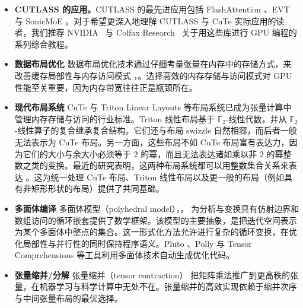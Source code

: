 \begin{itemize}
    \item {\bf CUTLASS 的应用。}CUTLASS 的最先进应用包括 FlashAttention \cite{dao2023flashattention2, shah2024flashattention3}、EVT \cite{chen2024evt} 与 SonicMoE \cite{sonic}。对于希望更深入地理解 CUTLASS 与 CuTe 实际应用的读者，我们推荐 NVIDIA~\cite{cecka2024cutlass, sun2025cutlass, thakkar2025cutlass} 与 Colfax Research~\cite{shah2024cutlass_streamk, shah2025cutlass_blackwell_tensor_memory, shah2025cutlass_blackwell_clusters, shah2025cutlass_blackwell_subbyte} 关于用这些库进行 GPU 编程的系列综合教程。
    \item {\bf 数据布局优化} 数据布局优化技术通过仔细考量张量在内存中的存储方式，来改善缓存局部性与内存访问模式 \cite{xu2023alt, bacon1994compiler, raman2007structure, ju1992reduction}，\cite{sharma2015data}。选择高效的内存存储与访问模式对 GPU 性能至关重要，因为内存带宽往往正是瓶颈所在。
    \item {\bf 现代布局系统} CuTe \cite{cutedocumentation, cutedsldocumentation, shah2024layout} 与 Triton Linear Layouts \cite{tritonlinearlayouts, zhou2026linear} 等布局系统已成为张量计算中管理内存存储与访问的行业标准。Triton 线性布局基于 $\mathbb{F}_2$-线性代数，并从 $\mathbb{F}_2$-线性算子的复合继承复合结构。它们还与布局 swizzle 自然相容，而后者一般无法表示为 CuTe 布局。另一方面，这些布局不如 CuTe 布局富有表达力，因为它们的大小与余大小必须等于 $2$ 的幂，而且无法表达诸如乘以非 $2$ 的幂整数之类的变换。最近的研究表明，这两种布局系统都可以用整数集合关系来表达 \cite{bhaskaracharya2025}。这为统一处理 CuTe 布局、Triton 线性布局以及更一般的布局（例如具有非矩形形状的布局）提供了共同基础。

    \item {\bf 多面体编译} 多面体模型（polyhedral model）\cite{verdoolaege2010isl}，\cite{verdoolaege2021presburger}，\cite{thangamani2024survey} 为分析与变换具有仿射边界和数组访问的循环嵌套提供了数学框架。该模型的主要抽象，是把迭代空间表示为某个多面体中整点的集合。这一形式化方法允许进行复杂的循环变换，在优化局部性与并行性的同时保持程序语义。Pluto \cite{bondhugula2008pluto}、Polly \cite{grosser2012polly} 与 Tensor Comprehensions \cite{vasilache2018tensor} 等工具利用多面体技术自动生成优化代码。
    \item {\bf 张量缩并/分解} 张量缩并（tensor contraction）\cite{ShiNiranjanAnandkumarCecka2016, zhao2022polyhedral, KoldaBader2009} 把矩阵乘法推广到更高秩的张量，在机器学习与科学计算中无处不在。张量缩并的高效实现依赖于缩并次序与中间张量布局的最优选择。
\end{itemize}

